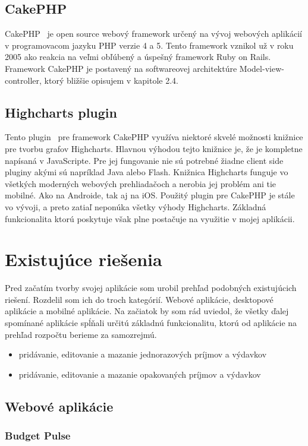 \documentclass[12pt,oneside]{book}
\begin{document}
\subsection{CakePHP} 
CakePHP \cite{CakePHP}\ je open source webový framework určený na vývoj webových aplikácií v programovacom jazyku PHP verzie 4 a 5. Tento framework vznikol už v roku 2005 ako reakcia na veľmi obľúbený a úspešný framework Ruby on Rails. Framework CakePHP je postavený na softwareovej architektúre Model-view-controller, ktorý bližšie opisujem v kapitole 2.4.


\subsection{Highcharts plugin} 
Tento plugin \cite{HighchartsPlugin}\ pre framework CakePHP využíva niektoré skvelé možnosti knižnice pre tvorbu grafov Highcharts. Hlavnou výhodou tejto knižnice je, že je kompletne napísaná v JavaScripte. Pre jej fungovanie nie sú potrebné žiadne client side pluginy akými sú napríklad Java alebo Flash. Knižnica Highcharts funguje vo všetkých moderných webových prehliadačoch a nerobia jej problém ani tie mobilné. Ako na Androide, tak aj na iOS. Použitý plugin pre CakePHP je stále vo vývoji, a preto zatiaľ neponúka všetky výhody Highcharts. Základná funkcionalita ktorú poskytuje však plne postačuje na využitie v mojej aplikácii.

\section{Existujúce riešenia}
Pred začatím tvorby svojej aplikácie som urobil prehľad podobných existujúcich riešení. Rozdelil som ich do troch kategórií. Webové aplikácie, desktopové aplikácie a mobilné aplikácie.
Na začiatok by som rád uviedol, že všetky ďalej spomínané aplikácie spĺňali určitú základnú funkcionalitu, ktorú od aplikácie na prehľad rozpočtu berieme za samozrejmú.
\begin{itemize}
\item{pridávanie, editovanie a mazanie jednorazových príjmov a výdavkov}
\item{pridávanie, editovanie a mazanie opakovaných príjmov a výdavkov}
\end{itemize}

\subsection{Webové aplikácie}
\subsubsection{Budget Pulse \cite{BudgetPulse}\ }
\end{document}
